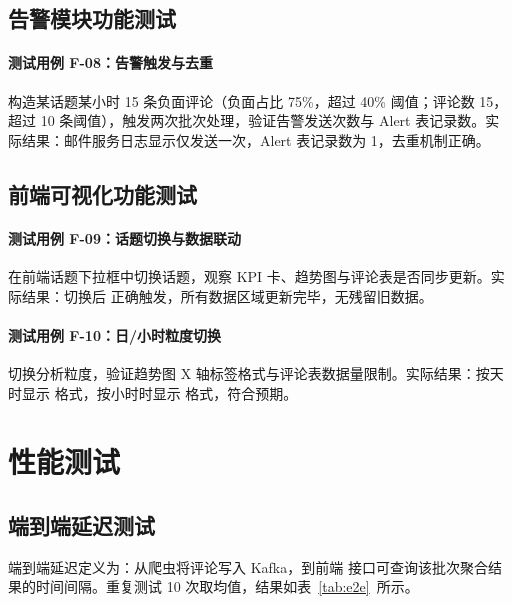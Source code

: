 \subsection{告警模块功能测试}

\paragraph{测试用例 F-08：告警触发与去重}
构造某话题某小时 15 条负面评论（负面占比 75\%，超过 40\% 阈值；评论数 15，超过 10 条阈值），触发两次批次处理，验证告警发送次数与 Alert 表记录数。实际结果：邮件服务日志显示仅发送一次，Alert 表记录数为 1，去重机制正确。

\subsection{前端可视化功能测试}

\paragraph{测试用例 F-09：话题切换与数据联动}
在前端话题下拉框中切换话题，观察 KPI 卡、趋势图与评论表是否同步更新。实际结果：切换后  正确触发，所有数据区域更新完毕，无残留旧数据。

\paragraph{测试用例 F-10：日/小时粒度切换}
切换分析粒度，验证趋势图 X 轴标签格式与评论表数据量限制。实际结果：按天时显示  格式，按小时时显示  格式，符合预期。

\section{性能测试}

\subsection{端到端延迟测试}

端到端延迟定义为：从爬虫将评论写入 Kafka，到前端  接口可查询该批次聚合结果的时间间隔。重复测试 10 次取均值，结果如表~\ref{tab:e2e}~所示。

